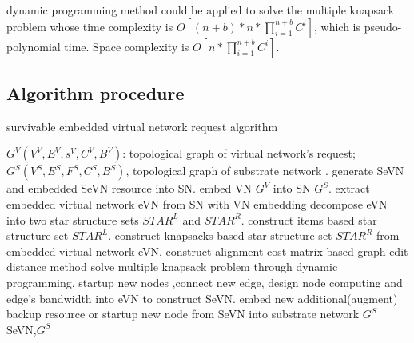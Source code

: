 dynamic programming method  could be applied to solve the multiple knapsack problem whose time complexity is $O[(n+b)*n*\prod_{i=1}^{n+b}C^i]$, which is pseudo-polynomial time. Space complexity is $O[n*\prod_{i=1}^{n+b}C^i]$.


\subsection{Algorithm procedure}

\begin{algorithm}
\caption{survivable embedded virtual network request algorithm}
\label{alg:SeVNAlg}
\begin{algorithmic}[1]
\REQUIRE $G^V (V^V,E^V,s^V,C^V,B^V)$:  topological graph of virtual network's request; $G^S (V^S,E^S,F^S,C^S,B^S)$, topological graph of substrate network .
\ENSURE generate SeVN and embedded SeVN resource into SN.
\STATE embed VN $G^V$ into SN $G^S$.
\STATE extract embedded virtual network eVN from SN with VN embedding
\STATE decompose eVN into two star structure sets $STAR^L$ and $STAR^R$.
\STATE construct items based star structure set $STAR^L$.
\STATE construct knapsacks based star structure set $STAR^R$ from embedded virtual network eVN.
\STATE construct alignment cost matrix based graph edit distance method\cite{sanfeliu1983distance}
\STATE solve multiple knapsack problem through dynamic programming.
\STATE startup new nodes ,connect new edge, design node computing and edge's bandwidth into eVN to construct SeVN.
\STATE embed new additional(augment) backup resource or startup new node from SeVN into substrate network $G^S$
\ENDFOR
\RETURN SeVN,$G^S$
\end{algorithmic}
\end{algorithm}





